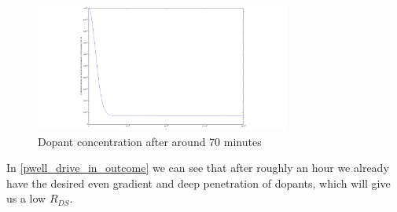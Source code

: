 \begin{figure}[H]
	\centering
	\includegraphics[width=0.75\textwidth]{p-well-diffusion.png}
	\caption{Dopant concentration after around 70 minutes}
	\label{pwell_drive_in_outcome}
\end{figure}

In \autoref{pwell_drive_in_outcome} we can see that after roughly an hour we already have the desired even gradient and deep penetration of dopants, which will give us a low $R_{DS}$.